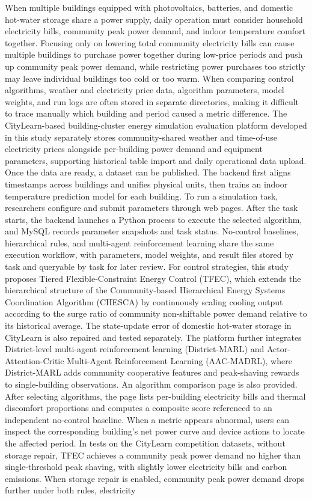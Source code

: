 \begin{EnglishAbstract}
    When multiple buildings equipped with photovoltaics, batteries, and domestic hot-water storage share a power supply, daily operation must consider household electricity bills, community peak power demand, and indoor temperature comfort together. Focusing only on lowering total community electricity bills can cause multiple buildings to purchase power together during low-price periods and push up community peak power demand, while restricting power purchases too strictly may leave individual buildings too cold or too warm. When comparing control algorithms, weather and electricity price data, algorithm parameters, model weights, and run logs are often stored in separate directories, making it difficult to trace manually which building and period caused a metric difference. The CityLearn-based \mbox{building-cluster} energy simulation evaluation platform developed in this study separately stores community-shared weather and \mbox{time-of-use} electricity prices alongside per-building power demand and equipment parameters, supporting historical table import and daily operational data upload. Once the data are ready, a dataset can be published. The backend first aligns timestamps across buildings and unifies physical units, then trains an indoor temperature prediction model for each building. To run a simulation task, researchers configure and submit parameters through web pages. After the task starts, the backend launches a Python process to execute the selected algorithm, and MySQL records parameter snapshots and task status. No-control baselines, hierarchical rules, and multi-agent reinforcement learning share the same execution workflow, with parameters, model weights, and result files stored by task and queryable by task for later review. For control strategies, this study proposes Tiered Flexible-Constraint Energy Control (TFEC), which extends the hierarchical structure of the Community-based Hierarchical Energy Systems Coordination Algorithm (CHESCA) by continuously scaling cooling output according to the surge ratio of community non-shiftable power demand relative to its historical average. The state-update error of domestic hot-water storage in CityLearn is also repaired and tested separately. The platform further integrates District-level multi-agent reinforcement learning (District-MARL) and Actor-Attention-Critic Multi-Agent Reinforcement Learning (\mbox{AAC-MADRL}), where District-MARL adds community cooperative features and peak-shaving rewards to single-building observations. An algorithm comparison page is also provided. After selecting algorithms, the page lists per-building electricity bills and thermal discomfort proportions and computes a composite score referenced to an independent no-control baseline. When a metric appears abnormal, users can inspect the corresponding building's net power curve and device actions to locate the affected period. In tests on the CityLearn competition datasets, without storage repair, TFEC achieves a community peak power demand no higher than single-threshold peak shaving, with slightly lower electricity bills and carbon emissions. When storage repair is enabled, community peak power demand drops further under both rules, electricity 
\end{EnglishAbstract}

